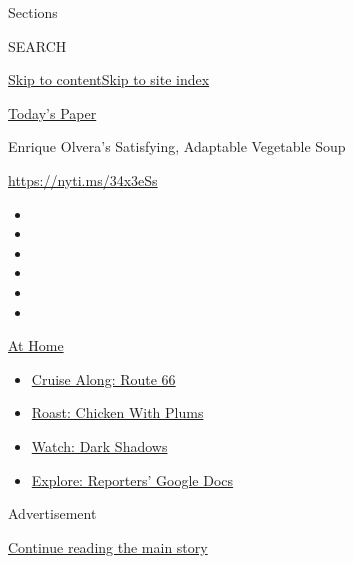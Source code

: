 Sections

SEARCH

\protect\hyperlink{site-content}{Skip to
content}\protect\hyperlink{site-index}{Skip to site index}

\href{https://myaccount.nytimes3xbfgragh.onion/auth/login?response_type=cookie\&client_id=vi}{}

\href{https://www.nytimes3xbfgragh.onion/section/todayspaper}{Today's
Paper}

Enrique Olvera's Satisfying, Adaptable Vegetable Soup

\url{https://nyti.ms/34x3eSs}

\begin{itemize}
\item
\item
\item
\item
\item
\item
\end{itemize}

\href{https://www.nytimes3xbfgragh.onion/spotlight/at-home?action=click\&pgtype=Article\&state=default\&region=TOP_BANNER\&context=at_home_menu}{At
Home}

\begin{itemize}
\tightlist
\item
  \href{https://www.nytimes3xbfgragh.onion/2020/09/07/travel/route-66.html?action=click\&pgtype=Article\&state=default\&region=TOP_BANNER\&context=at_home_menu}{Cruise
  Along: Route 66}
\item
  \href{https://www.nytimes3xbfgragh.onion/2020/09/04/dining/sheet-pan-chicken.html?action=click\&pgtype=Article\&state=default\&region=TOP_BANNER\&context=at_home_menu}{Roast:
  Chicken With Plums}
\item
  \href{https://www.nytimes3xbfgragh.onion/2020/09/04/arts/television/dark-shadows-stream.html?action=click\&pgtype=Article\&state=default\&region=TOP_BANNER\&context=at_home_menu}{Watch:
  Dark Shadows}
\item
  \href{https://www.nytimes3xbfgragh.onion/interactive/2020/at-home/even-more-reporters-editors-diaries-lists-recommendations.html?action=click\&pgtype=Article\&state=default\&region=TOP_BANNER\&context=at_home_menu}{Explore:
  Reporters' Google Docs}
\end{itemize}

Advertisement

\protect\hyperlink{after-top}{Continue reading the main story}

